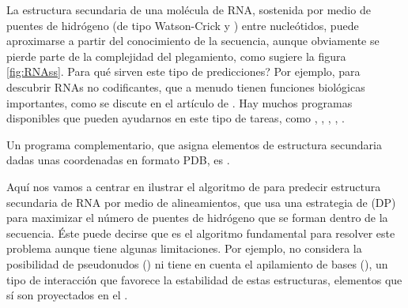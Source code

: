 La estructura secundaria de una mol\'{e}cula de RNA, sostenida por medio de 
puentes de hidr\'{o}geno (de tipo Watson-Crick y
) entre nucle\'{o}tidos,
puede aproximarse a partir del conocimiento de la secuencia, aunque obviamente se pierde parte de la complejidad
del plegamiento, como sugiere la figura \ref{fig:RNAss}. Para qu\'{e} sirven este tipo de predicciones? 
Por ejemplo, para descubrir RNAs no codificantes, que a menudo tienen funciones biol\'{o}gicas importantes, 
como se discute en el art\'{i}culo de \cite{Washietl2005}.
Hay muchos programas disponibles que pueden ayudarnos en este tipo de tareas, como 
,
,
,
, 
.

Un programa complementario, que asigna elementos de estructura secundaria dadas unas coordenadas en formato PDB, es 
.

Aqu\'{i} nos vamos a centrar en ilustrar el algoritmo de \citet{Nussinov1978} para predecir estructura secundaria de RNA 
por medio de alineamientos, %
que usa una estrategia de 
 (DP)
para maximizar el n\'{u}mero de puentes de hidr\'{o}geno que se forman dentro de la secuencia. \'{E}ste puede decirse que es
el algoritmo fundamental para resolver este problema aunque tiene algunas limitaciones. Por ejemplo, no considera la posibilidad de 
pseudonudos () ni tiene en cuenta el 
apilamiento de bases (),
un tipo de interacci\'{o}n que favorece la estabilidad de estas estructuras, elementos que s\'{i} son proyectados en el
 \citep{dotu_ivan_2014_1066354}.

